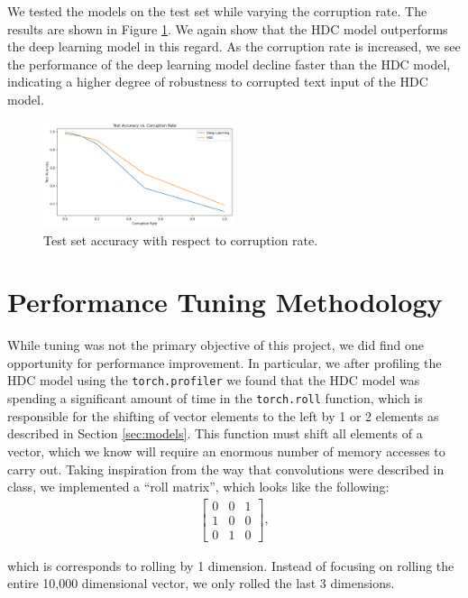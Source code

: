 \documentclass[conference]{IEEEtran}
\begin{document}
We tested the models on the test set while varying the corruption rate. The results are shown in Figure \ref{fig:robustness}. We again show that the HDC model outperforms the deep learning model in this regard. As the corruption rate is increased, we see the performance of the deep learning model decline faster than the HDC model, indicating a higher degree of robustness to corrupted text input of the HDC model.

\begin{figure}[htbp]
\centerline{\includegraphics[width=0.5\textwidth]{analysis/corruption.png}}
\caption{Test set accuracy with respect to corruption rate.}
\label{fig:robustness}
\end{figure}

\section{Performance Tuning Methodology}
While tuning was not the primary objective of this project, we did find one opportunity for performance improvement. In particular, we after profiling the HDC model using the \verb|torch.profiler| we found that the HDC model was spending a significant amount of time in the \verb|torch.roll| function, which is responsible for the shifting of vector elements to the left by 1 or 2 elements as described in Section \ref{sec:models}. This function must shift all elements of a vector, which we know will require an enormous number of memory accesses to carry out. Taking inspiration from the way that convolutions were described in class, we implemented a ``roll matrix'', which looks like the following:
\begin{align}
    \begin{bmatrix}
    0 & 0 & 1 \\
    1 & 0 & 0 \\
    0 & 1 & 0
    \end{bmatrix},
\end{align}

which is corresponds to rolling by 1 dimension. Instead of focusing on rolling the entire 10,000 dimensional vector, we only rolled the last 3 dimensions.
\end{document}
